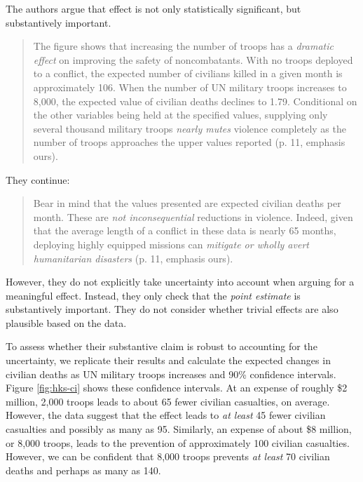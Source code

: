 \documentclass[12pt]{article}
\begin{document}
The authors argue that effect is not only statistically significant, but substantively important.

\begin{quote}
The figure shows that increasing the number of troops has a \emph{dramatic effect} on improving the safety of noncombatants. With no troops deployed to a conflict, the expected number of civilians killed in a given month is approximately 106. When the number of UN military troops increases to 8,000, the expected value of civilian deaths declines to 1.79. Conditional on the other variables being held at the specified values, supplying only several thousand military troops \emph{nearly mutes} violence completely as the number of troops approaches the upper values reported (p. 11, emphasis ours).
\end{quote}

\noindent They continue:

\begin{quote}
Bear in mind that the values presented are expected civilian deaths per month. These are \emph{not inconsequential} reductions in violence. Indeed, given that the average length of a conflict in these data is nearly 65 months, deploying highly equipped missions can \emph{mitigate or wholly avert humanitarian disasters} (p. 11, emphasis ours).
\end{quote}

However, they do not explicitly take uncertainty into account when arguing for a meaningful effect. Instead, they only check that the \emph{point estimate} is substantively important. They do not consider whether trivial effects are also plausible based on the data.

To assess whether their substantive claim is robust to accounting for the uncertainty, we replicate their results and calculate the expected changes in civilian deaths as UN military troops increases and 90\% confidence intervals. Figure \ref{fig:hks-ci} shows these confidence intervals. At an expense of roughly \$2 million, 2,000 troops leads to about 65 fewer civilian casualties, on average. However, the data suggest that the effect leads to \textit{at least} 45 fewer civilian casualties and possibly as many as 95. Similarly, an expense of about \$8 million, or 8,000 troops, leads to the prevention of approximately 100 civilian casualties. However, we can be confident that 8,000 troops prevents \emph{at least} 70 civilian deaths and perhaps as many as 140. 
\end{document}
